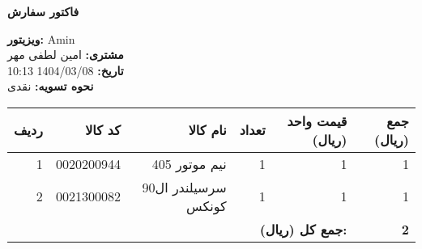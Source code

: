 \documentclass[a4paper,12pt]{article}
\begin{document}
        \begin{center}
            \textbf{\Large فاکتور سفارش}
        \end{center}
        \vspace{0.5cm}
        \begin{flushright}
            \textbf{ویزیتور:} Amin \\
            \textbf{مشتری:} امین لطفی مهر \\
            \textbf{تاریخ:} 1404/03/08 10:13 \\
            \textbf{نحوه تسویه:} نقدی
        \end{flushright}
        \vspace{0.5cm}
        \begin{longtable}{|r|r|r|r|r|r|}
            \hline
            \textbf{ردیف} & \textbf{کد کالا} & \textbf{نام کالا} & \textbf{تعداد} & \textbf{قیمت واحد (ریال)} & \textbf{جمع (ریال)} \\
            \hline
            \endhead
                    1 & 0020200944 & نيم موتور 405 & 1 & 1 & 1 \\
            \hline
            2 & 0021300082 & سرسيلندر ال90 کونکس & 1 & 1 & 1 \\
            \hline

            \hline
            \multicolumn{5}{|r|}{\textbf{جمع کل (ریال):}} & \textbf{ 2 } \\
            \hline
        \end{longtable}
        
\end{document}
